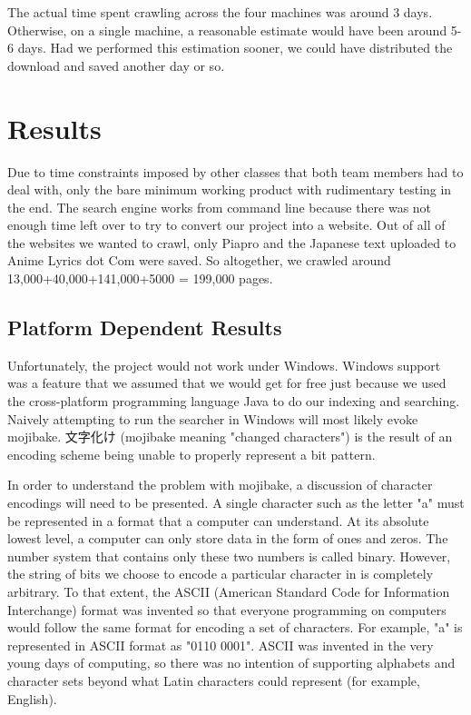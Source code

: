 \documentclass{acm} %
\begin{document}
\begin{CJK}{UTF8}{zhsong}
The actual time spent crawling across the four machines was around 3 days. Otherwise, on a single machine, a reasonable estimate would have been around 5-6 days. Had we performed this estimation sooner, we could have distributed the download and saved another day or so.

\section{Results}

Due to time constraints imposed by other classes that both team members had to deal with, only the bare minimum working product with rudimentary testing in the end. The search engine works from command line because there was not enough time left over to try to convert our project into a website. Out of all of the websites we wanted to crawl, only Piapro and the Japanese text uploaded to Anime Lyrics dot Com were saved. So altogether, we crawled around 13,000+40,000+141,000+5000 = 199,000 pages.

\subsection{Platform Dependent Results}

Unfortunately, the project would not work under Windows. Windows support was a feature that we assumed that we would get for free just because we used the cross-platform programming language Java to do our indexing and searching. Naively attempting to run the searcher in Windows will most likely evoke mojibake. 文字化け (mojibake meaning "changed characters") is the result of an encoding scheme being unable to properly represent a bit pattern.

In order to understand the problem with mojibake, a discussion of character encodings will need to be presented. A single character such as the letter "a" must be represented in a format that a computer can understand. At its absolute lowest level, a computer can only store data in the form of ones and zeros. The number system that contains only these two numbers is called binary. However, the string of bits we choose to encode a particular character in is completely arbitrary. To that extent, the ASCII (American Standard Code for Information Interchange) format was invented so that everyone programming on computers would follow the same format for encoding a set of characters. For example, "a" is represented in ASCII format as "0110 0001". ASCII was invented in the very young days of computing, so there was no intention of supporting alphabets and character sets beyond what Latin characters could represent (for example, English).


\end{CJK}
\end{document}

